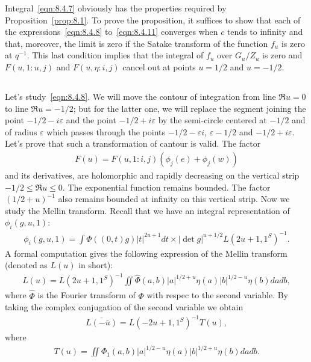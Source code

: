Integral~\eqref{eqn:8.4.7} obviously has the properties required by Proposition~\ref{prop:8.1}.
To prove the proposition, it suffices to show that each of the expressions~\eqref{eqn:8.4.8} to~\eqref{eqn:8.4.11} converges when $c$ tends to infinity
and that, moreover, the limit is zero if the Satake transform of the function $f_u$ is zero at $q^{-1}$.
This last condition implies that the integral of $f_u$ over $G_u/Z_u$ is zero and  $F(u, 1:u, j)$ and $F(u, \eta:i, j)$ cancel out at points $u =1/2$ and $u=-1/2$.


\subsection{}
Let's study~\eqref{eqn:8.4.8}.
We will move the contour of integration from line $\Re u = 0$ to line $\Re u = -1/2$; 
but for the latter one, we will replace the segment joining the point $-1/2-i\varepsilon$ and the point $-1/2+i\varepsilon$ by the semi-circle centered at $-1/2$ and of radius $\varepsilon$
which passes through the points $-1/2-\varepsilon i$, $\varepsilon-1/2$ and $-1/2+i\varepsilon$.
Let's prove that such a transformation of cantour is valid.
The factor
\begin{align*}
    F(u) = F(u, 1:i, j)(\phi_j(e) + \phi_j(w))
\end{align*}
and its derivatives, are holomorphic and rapidly decreasing on the vertical strip $-1/2\leq \Re u \leq 0$.
The exponential function remains bounded.
The factor $(1/2+u)^{-1}$ also remains bounded at infinity on this vertical strip.
Now we study the Mellin transform.
Recall that we have an integral representation of $\phi_i(g, u, 1)$:
\begin{align*}
    \phi_i(g, u, 1) = \int \Phi((0, t) g) |t|^{2u+1} dt \times |\det g|^{u+1/2} L(2u+1, 1^{S})^{-1}.
\end{align*}
A formal computation gives the following expression of the Mellin transform (denoted as $L(u)$ in short):
\begin{align}
    L(u) = L(2u+1, 1^{S})^{-1} \iint \hat{\Phi}(a, b) |a|^{1/2+u} \eta(a) |b|^{1/2-u} \eta(b) dadb,
\end{align}
where $\hat{\Phi}$ is the Fourier transform of $\Phi$ with respec to the second variable.
By taking the complex conjugation of the second variable we obtain
\begin{align}
    \overline{L(-\bar{u})} = L(-2u+1, 1^{S})^{-1}T(u),
\end{align}
where
\begin{align}
    T(u) = \iint \Phi_1(a, b)|a|^{1/2-u} \eta(a) |b|^{1/2+u} \eta(b) dadb.
\end{align}
